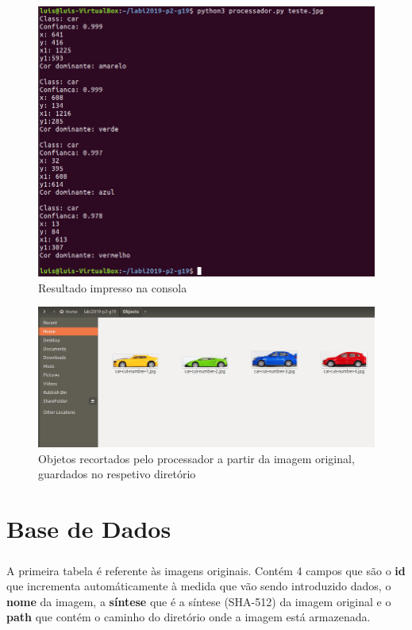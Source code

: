 \documentclass{report}
\begin{document}
\begin{figure}[H]
\centering
\includegraphics[width=0.75\linewidth]{consola.png}
\caption{Resultado impresso na consola}
\end{figure}


\begin{figure}[H]
\centering
\includegraphics[width=1.3\linewidth]{carros.png}
\caption{Objetos recortados pelo processador a partir da imagem original, guardados no respetivo diretório}
\end{figure}


\chapter{Base de Dados}
\label{chap.BD}
\paragraph{}

A primeira tabela é referente às imagens originais. Contém 4 campos que são o \textbf{id} que incrementa automáticamente à medida que vão sendo introduzido dados, o \textbf{nome} da imagem, a \textbf{síntese} que é a síntese (SHA-512) da imagem original e o \textbf{path} que contém o caminho do diretório onde a imagem está armazenada.
\end{document}
